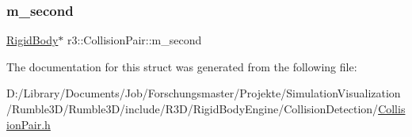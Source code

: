 \mbox{\label{structr3_1_1_collision_pair_ad7ff97123502a1e0535d3f5da8013411}} 
\subsubsection{\texorpdfstring{m\+\_\+second}{m\_second}}
{\footnotesize\ttfamily \mbox{\hyperlink{classr3_1_1_rigid_body}{Rigid\+Body}}$\ast$ r3\+::\+Collision\+Pair\+::m\+\_\+second}



The documentation for this struct was generated from the following file\+:\begin{DoxyCompactItemize}
\item 
D\+:/\+Library/\+Documents/\+Job/\+Forschungsmaster/\+Projekte/\+Simulation\+Visualization/\+Rumble3\+D/\+Rumble3\+D/include/\+R3\+D/\+Rigid\+Body\+Engine/\+Collision\+Detection/\mbox{\hyperlink{_collision_pair_8h}{Collision\+Pair.\+h}}\end{DoxyCompactItemize}

